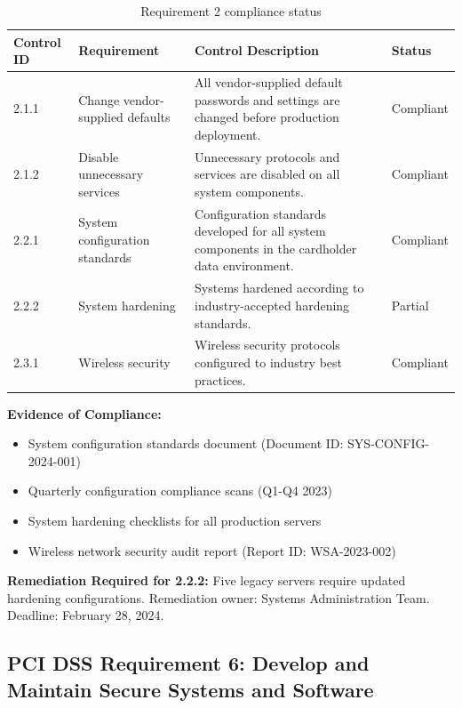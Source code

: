 \documentclass[
    language=english,
    doctype=compliance-document,
    institution=none,
]{../../omnilatex}
\begin{document}
\begin{table}[h]
\centering
\small
\begin{tabular}{p{3cm}p{5cm}p{4cm}p{3cm}}
\toprule
\textbf{Control ID} & \textbf{Requirement} & \textbf{Control Description} & \textbf{Status} \\
\midrule
2.1.1 & Change vendor-supplied defaults & All vendor-supplied default passwords and settings are changed before production deployment. & Compliant \\
2.1.2 & Disable unnecessary services & Unnecessary protocols and services are disabled on all system components. & Compliant \\
2.2.1 & System configuration standards & Configuration standards developed for all system components in the cardholder data environment. & Compliant \\
2.2.2 & System hardening & Systems hardened according to industry-accepted hardening standards. & Partial \\
2.3.1 & Wireless security & Wireless security protocols configured to industry best practices. & Compliant \\
\bottomrule
\end{tabular}
\caption{Requirement 2 compliance status}
\end{table}

\textbf{Evidence of Compliance:}
\begin{itemize}
    \item System configuration standards document (Document ID: SYS-CONFIG-2024-001)
    \item Quarterly configuration compliance scans (Q1-Q4 2023)
    \item System hardening checklists for all production servers
    \item Wireless network security audit report (Report ID: WSA-2023-002)
\end{itemize}

\textbf{Remediation Required for 2.2.2:} Five legacy servers require updated hardening configurations. Remediation owner: Systems Administration Team. Deadline: February 28, 2024.

\subsection{PCI DSS Requirement 6: Develop and Maintain Secure Systems and Software}
\end{document}
